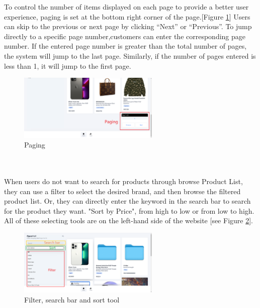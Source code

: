 \documentclass{article}
\begin{document}
To control the number of items displayed on each page to provide a better user experience, paging is set at the bottom right corner of the page.[Figure \ref{fig:paging}]  Users can skip to the previous or next page by clicking “Next” or “Previous”. To jump directly to a specific page number,customers can enter the corresponding page number. If the entered page number is greater than the total number of pages, the system will jump to the last page. Similarly, if the number of pages entered is less than 1, it will jump to the first page.
\begin{figure}[!htp]
    \centering
    \includegraphics[width=0.6\textwidth]{paging.png}
    \caption{\label{fig:paging}Paging}
\end{figure}
\\\\
When users do not want to search for products through browse Product List, they can use a filter to select the desired brand, and then browse the filtered product list. Or, they can directly enter the keyword in the search bar to search for the product they want. "Sort by Price", from high to low or from low to high. All of these selecting tools are on the left-hand side of the website [see Figure \ref{fig:filter and search bar and sort}].
\begin{figure}[!htp]
    \centering
    \includegraphics[width=0.6\textwidth]{search bar and sort.png}
    \caption{\label{fig:filter and search bar and sort} Filter, search bar and sort tool}
\end{figure}
\end{document}
